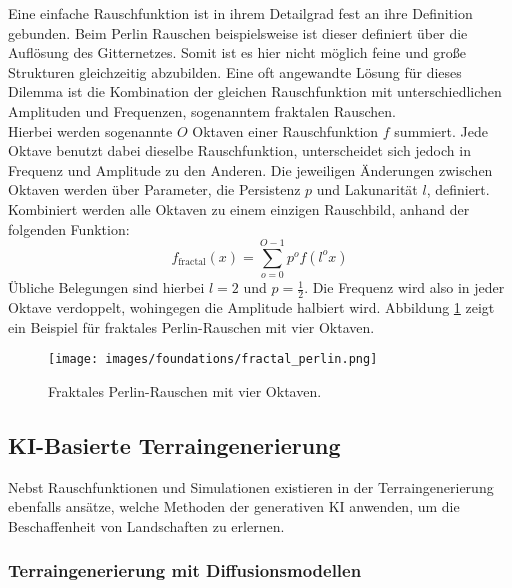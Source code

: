 Eine einfache Rauschfunktion ist in ihrem Detailgrad fest an ihre Definition gebunden. Beim Perlin Rauschen beispielsweise ist dieser definiert über die Auflösung des Gitternetzes. Somit ist es hier nicht möglich feine und große Strukturen gleichzeitig abzubilden. Eine oft angewandte Lösung für dieses Dilemma ist die Kombination der gleichen Rauschfunktion mit unterschiedlichen Amplituden und Frequenzen, sogenanntem fraktalen Rauschen. \\
Hierbei werden sogenannte $O$ Oktaven einer Rauschfunktion $f$ summiert. Jede  Oktave benutzt dabei dieselbe Rauschfunktion, unterscheidet sich jedoch in Frequenz und Amplitude zu den Anderen. Die jeweiligen Änderungen zwischen Oktaven werden über Parameter, die Persistenz $p$ und Lakunarität $l$, definiert. Kombiniert werden alle Oktaven zu einem einzigen Rauschbild, anhand der folgenden Funktion:  
\begin{equation}
    f_\text{fractal}(x) = \sum_{o=0}^{O-1} p^{o}f(l^ox)
\end{equation}
Übliche Belegungen sind hierbei $l=2$ und $p=\frac{1}{2}$. Die Frequenz wird also in jeder Oktave verdoppelt, wohingegen die Amplitude halbiert wird. Abbildung \ref{fig:fractal_perlin} zeigt ein Beispiel für fraktales Perlin-Rauschen mit vier Oktaven.

\begin{figure}[ht]
    \centering
    \texttt{[image: images/foundations/fractal\_perlin.png]} 
    \caption{Fraktales Perlin-Rauschen mit vier Oktaven.}
    \label{fig:fractal_perlin}
\end{figure}

\subsection{KI-Basierte Terraingenerierung}

Nebst Rauschfunktionen und Simulationen existieren in der Terraingenerierung ebenfalls ansätze, welche Methoden der generativen KI anwenden, um die Beschaffenheit von Landschaften zu erlernen.




\subsubsection{Terraingenerierung mit Diffusionsmodellen}

